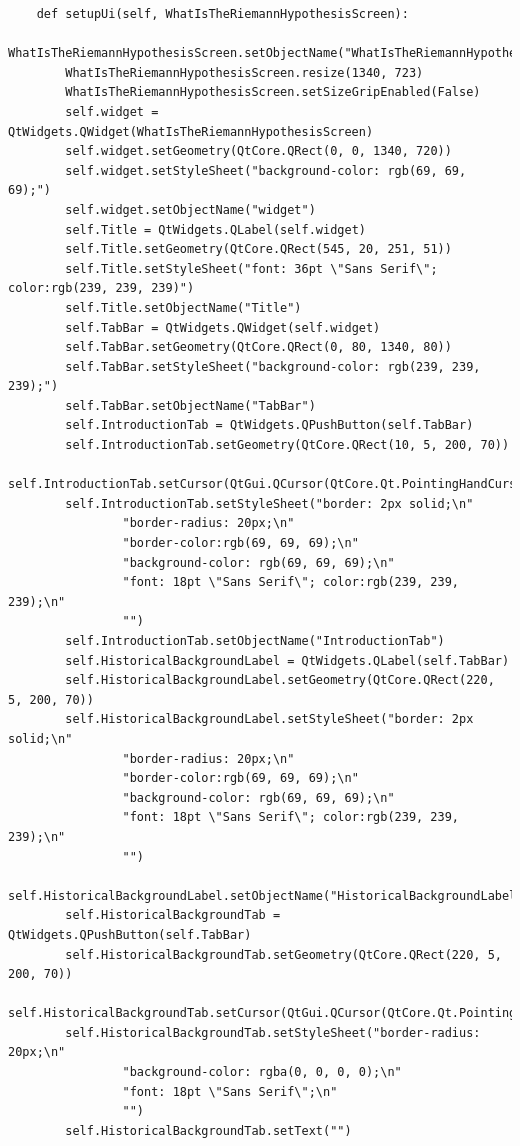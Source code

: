 \documentclass{article}
\begin{document}
\begin{lstlisting}
    def setupUi(self, WhatIsTheRiemannHypothesisScreen):
        WhatIsTheRiemannHypothesisScreen.setObjectName("WhatIsTheRiemannHypothesisScreen")
        WhatIsTheRiemannHypothesisScreen.resize(1340, 723)
        WhatIsTheRiemannHypothesisScreen.setSizeGripEnabled(False)
        self.widget = QtWidgets.QWidget(WhatIsTheRiemannHypothesisScreen)
        self.widget.setGeometry(QtCore.QRect(0, 0, 1340, 720))
        self.widget.setStyleSheet("background-color: rgb(69, 69, 69);")
        self.widget.setObjectName("widget")
        self.Title = QtWidgets.QLabel(self.widget)
        self.Title.setGeometry(QtCore.QRect(545, 20, 251, 51))
        self.Title.setStyleSheet("font: 36pt \"Sans Serif\"; color:rgb(239, 239, 239)")
        self.Title.setObjectName("Title")
        self.TabBar = QtWidgets.QWidget(self.widget)
        self.TabBar.setGeometry(QtCore.QRect(0, 80, 1340, 80))
        self.TabBar.setStyleSheet("background-color: rgb(239, 239, 239);")
        self.TabBar.setObjectName("TabBar")
        self.IntroductionTab = QtWidgets.QPushButton(self.TabBar)
        self.IntroductionTab.setGeometry(QtCore.QRect(10, 5, 200, 70))
        self.IntroductionTab.setCursor(QtGui.QCursor(QtCore.Qt.PointingHandCursor))
        self.IntroductionTab.setStyleSheet("border: 2px solid;\n"
                "border-radius: 20px;\n"
                "border-color:rgb(69, 69, 69);\n"
                "background-color: rgb(69, 69, 69);\n"
                "font: 18pt \"Sans Serif\"; color:rgb(239, 239, 239);\n"
                "")
        self.IntroductionTab.setObjectName("IntroductionTab")
        self.HistoricalBackgroundLabel = QtWidgets.QLabel(self.TabBar)
        self.HistoricalBackgroundLabel.setGeometry(QtCore.QRect(220, 5, 200, 70))
        self.HistoricalBackgroundLabel.setStyleSheet("border: 2px solid;\n"
                "border-radius: 20px;\n"
                "border-color:rgb(69, 69, 69);\n"
                "background-color: rgb(69, 69, 69);\n"
                "font: 18pt \"Sans Serif\"; color:rgb(239, 239, 239);\n"
                "")
        self.HistoricalBackgroundLabel.setObjectName("HistoricalBackgroundLabel")
        self.HistoricalBackgroundTab = QtWidgets.QPushButton(self.TabBar)
        self.HistoricalBackgroundTab.setGeometry(QtCore.QRect(220, 5, 200, 70))
        self.HistoricalBackgroundTab.setCursor(QtGui.QCursor(QtCore.Qt.PointingHandCursor))
        self.HistoricalBackgroundTab.setStyleSheet("border-radius: 20px;\n"
                "background-color: rgba(0, 0, 0, 0);\n"
                "font: 18pt \"Sans Serif\";\n"
                "")
        self.HistoricalBackgroundTab.setText("")

\end{lstlisting}
\end{document}
